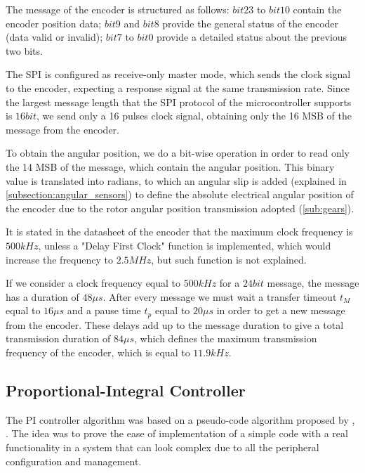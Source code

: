 The message of the encoder is structured as follows: $bit23$ to $bit10$ contain the encoder position data; $bit9$ and $bit8$ provide the general status of the encoder (data valid or invalid); $bit7$ to $bit0$ provide a detailed status about the previous two bits.

The \ac{SPI} is configured as receive-only master mode, which sends the clock signal to the encoder, expecting a response signal at the same transmission rate. Since the largest message length that the \ac{SPI} protocol of the microcontroller supports is $16bit$, we send only a 16 pulses clock signal, obtaining only the 16 \acf{MSB} of the message from the encoder. 

To obtain the angular position, we do a bit-wise operation in order to read only the 14 \ac{MSB} of the message, which contain the angular position. This binary value is translated into radians, to which an angular slip is added (explained in \ref{subsection:angular_sensors}) to define the absolute electrical angular position of the encoder due to the rotor angular position transmission adopted (\ref{sub:gears}).

It is stated in the datasheet of the encoder that the maximum clock frequency is $500kHz$, unless a "Delay First Clock" function is implemented, which would increase the frequency to $2.5MHz$, but such function is not explained.

If we consider a clock frequency equal to $500kHz$ for a $24bit$ message, the message has a duration of $48\mu s$. After every message we must wait a transfer timeout $t_{M}$ equal to $16\mu s$ and a pause time $t_{p}$ equal to $20\mu s$ in order to get a new message from the encoder. These delays add up to the message duration to give a total transmission duration of $84\mu s$, which defines the maximum transmission frequency of the encoder, which is equal to $11.9kHz$.

\subsection{Proportional-Integral Controller}

The \ac{PI} controller algorithm was based on a pseudo-code algorithm proposed by \citeauthor{sistemi_di_controllo:2007}, \citeyear{sistemi_di_controllo:2007}. The idea was to prove the ease of implementation of a simple code with a real functionality in a system that can look complex due to all the peripheral configuration and management.



